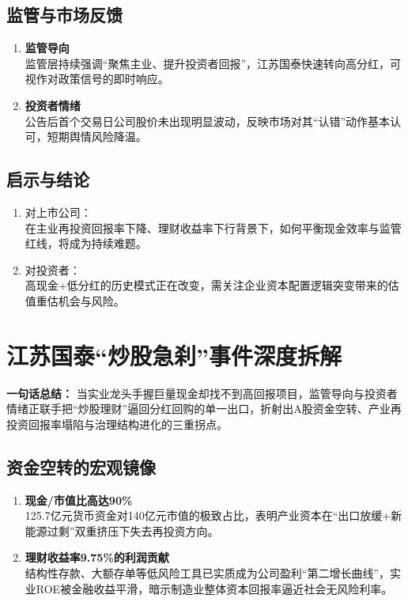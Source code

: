 \subsection{监管与市场反馈}
\begin{enumerate}[leftmargin=*, nosep]
    \item \textbf{监管导向}  \\
    监管层持续强调“聚焦主业、提升投资者回报”，江苏国泰快速转向高分红，可视作对政策信号的即时响应。
    \item \textbf{投资者情绪}  \\
    公告后首个交易日公司股价未出现明显波动，反映市场对其“认错”动作基本认可，短期舆情风险降温。
\end{enumerate}

\subsection{启示与结论}
\begin{enumerate}[leftmargin=*, nosep]
    \item 对上市公司：  \\
    在主业再投资回报率下降、理财收益率下行背景下，如何平衡现金效率与监管红线，将成为持续难题。
    \item 对投资者：  \\
    高现金+低分红的历史模式正在改变，需关注企业资本配置逻辑突变带来的估值重估机会与风险。
\end{enumerate}


\section{江苏国泰“炒股急刹”事件深度拆解}
\textbf{一句话总结：}  
当实业龙头手握巨量现金却找不到高回报项目，监管导向与投资者情绪正联手把“炒股理财”逼回分红回购的单一出口，折射出A股资金空转、产业再投资回报率塌陷与治理结构进化的三重拐点。

\subsection{资金空转的宏观镜像}
\begin{enumerate}[leftmargin=*, nosep]
    \item \textbf{现金/市值比高达90\%}  \\
    125.7亿元货币资金对140亿元市值的极致占比，表明产业资本在“出口放缓+新能源过剩”双重挤压下失去再投资方向。  
    \item \textbf{理财收益率9.75\%的利润贡献}  \\
    结构性存款、大额存单等低风险工具已实质成为公司盈利“第二增长曲线”，实业ROE被金融收益平滑，暗示制造业整体资本回报率逼近社会无风险利率。
\end{enumerate}

